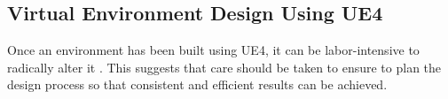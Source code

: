 


\subsection{Virtual Environment Design Using UE4}
Once an environment has been built using UE4, it can be labor-intensive to radically alter it \cite[p.~454]{Rouse2004GamePractice}. This suggests that care should be taken to ensure to plan the design process so that consistent and efficient results can be achieved.

